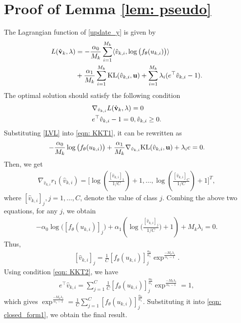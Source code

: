 \documentclass[twoside,journal]{IEEEtran}
\def\VectorFont{\bf}
\newcommand{\vu}{{\VectorFont u}}
\newcommand{\vv}{{\VectorFont v}}
\begin{document}
\vspace{-0.0cm}
		\appendices
\section{Proof of Lemma \ref{lem: pseudo}}\label{proof_lemma}
The Lagrangian function of \eqref{update_y} is given by
\begin{align}\label{LVL}
\nonumber L(\hat{\vv}_{k},\lambda) &=  -\frac{\alpha_0}{M_k} \sum_{i=1}^{M_k}\langle \hat{v}_{k,i},\log\big(f_{\theta}(u_{k,i})\big)\rangle\\
 &+\frac{\alpha_1}{M_k}\sum_{i=1}^{M_k}  {\rm KL}(\hat{v}_{k,i},\vu) +\sum_{i=1}^{M_k}\lambda_i(e^\top\hat{v}_{k,i}-1).
\end{align}
The optimal solution should satisfy the following condition
\begin{align}
\label{eqn: KKT1}&\nabla_{\hat{v}_{k,i}} L(\hat{\vv}_{k},\lambda) = 0\\
\label{eqn: KKT2}&e^\top\hat{v}_{k,i}-1=0, \hat{v}_{k,i}\geq0.
\end{align}
Substituting \eqref{LVL} into \eqref{eqn: KKT1}, it can be rewritten as
\begin{align*}
-\frac{\alpha_0}{M_k}\log\big(f_{\theta}(u_{k,i})\big)+\frac{\alpha_1}{M_k}\nabla_{\hat{v}_{k,i}} {\rm KL}(\hat{v}_{k,i},\vu)+\lambda_ie=0.
\end{align*}
Then, we get
\begin{align*}
\nabla_{\hat{v}_{k,i}} r_1(\hat{v}_{k,i})=\Big[\log\left(\frac{[\hat{v}_{k,i}]_1}{1/C}\right)+1,\ldots,
\log\left(\frac{[\hat{v}_{k,i}]_C}{1/C}\right)+1\Big]^T,
\end{align*}
where $[\hat{v}_{k,i}]_j, j=1,\ldots,C$, denote the value of class $j$. Combing the above two equations, for any $j$, we obtain
 \begin{align*}
 -\alpha_0\log\big([f_{\theta}(u_{k,i})]_j\big)+\alpha_1\left(\log\Big(\frac{[\hat{v}_{k,i}]_j}
 {1/C}\Big)+1\right)
 +M_k\lambda_i=0.
\end{align*}
Thus,
\begin{align}
\label{eqn: closed_form1}[\hat{v}_{k,i}]_j=\frac{1}{C}[f_{\theta}(u_{k,i})]_j^{\frac{\alpha_0}{\alpha_1}} \exp^{\frac{-M_k\lambda_i}{\alpha_1-1}}.
\end{align}
Using condition \eqref{eqn: KKT2},  we have
\begin{align}
e^\top \hat{v}_{k,i}=\sum_{j=1}^C\frac{1}{C}[f_{\theta}(u_{k,i})]_j^{\frac{\alpha_0}{\alpha_1}} \exp^{\frac{-M_k\lambda_i}{\alpha_1-1}}=1,
\end{align}
which gives $\exp^{\frac{-M_k\lambda_i}{\alpha_1-1}}= \frac{1}{C}\sum_{j=1}^C[f_{\theta}(u_{k,i})]_j^{\frac{\alpha_0}{\alpha_1}}$. Substituting it into \eqref{eqn: closed_form1}, we obtain the final result.
\end{document}
